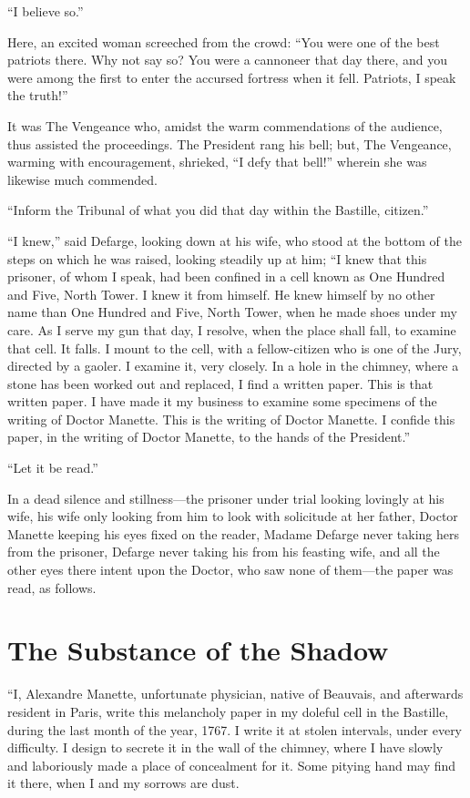 ``I believe so.''

Here, an excited woman screeched from the crowd:  ``You were one of the
best patriots there.  Why not say so?  You were a cannoneer that day
there, and you were among the first to enter the accursed fortress
when it fell.  Patriots, I speak the truth!''

It was The Vengeance who, amidst the warm commendations of the
audience, thus assisted the proceedings.  The President rang his
bell; but, The Vengeance, warming with encouragement, shrieked,
``I defy that bell!'' wherein she was likewise much commended.

``Inform the Tribunal of what you did that day within the Bastille,
citizen.''

``I knew,'' said Defarge, looking down at his wife, who stood at the
bottom of the steps on which he was raised, looking steadily up at
him; ``I knew that this prisoner, of whom I speak, had been confined
in a cell known as One Hundred and Five, North Tower.  I knew it from
himself. He knew himself by no other name than One Hundred and Five,
North Tower, when he made shoes under my care.  As I serve my gun
that day, I resolve, when the place shall fall, to examine that cell.
It falls.  I mount to the cell, with a fellow-citizen who is one of
the Jury, directed by a gaoler.  I examine it, very closely.  In a
hole in the chimney, where a stone has been worked out and replaced,
I find a written paper.  This is that written paper.  I have made it
my business to examine some specimens of the writing of Doctor
Manette.  This is the writing of Doctor Manette.  I confide this
paper, in the writing of Doctor Manette, to the hands of the President.''

``Let it be read.''

In a dead silence and stillness---the prisoner under trial looking
lovingly at his wife, his wife only looking from him to look with
solicitude at her father, Doctor Manette keeping his eyes fixed on
the reader, Madame Defarge never taking hers from the prisoner,
Defarge never taking his from his feasting wife, and all the other
eyes there intent upon the Doctor, who saw none of them---the paper
was read, as follows.



\chapter{The Substance of the Shadow}


``I, Alexandre Manette, unfortunate physician, native of Beauvais,
and afterwards resident in Paris, write this melancholy paper in my
doleful cell in the Bastille, during the last month of the year,
1767. I write it at stolen intervals, under every difficulty.
I design to secrete it in the wall of the chimney, where I have
slowly and laboriously made a place of concealment for it.  Some
pitying hand may find it there, when I and my sorrows are dust.

